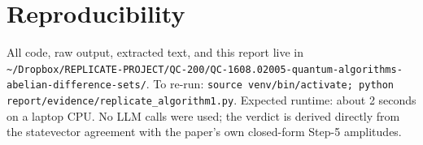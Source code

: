 \documentclass[11pt]{article}
\begin{document}
\section{Reproducibility}

All code, raw output, extracted text, and this report live in
\verb|~/Dropbox/REPLICATE-PROJECT/QC-200/QC-1608.02005-quantum-algorithms-abelian-difference-sets/|.
To re-run: \verb|source venv/bin/activate; python report/evidence/replicate_algorithm1.py|.
Expected runtime: about 2 seconds on a laptop CPU.
No LLM calls were used; the verdict is derived directly from the
statevector agreement with the paper's own closed-form Step-5 amplitudes.
\end{document}
